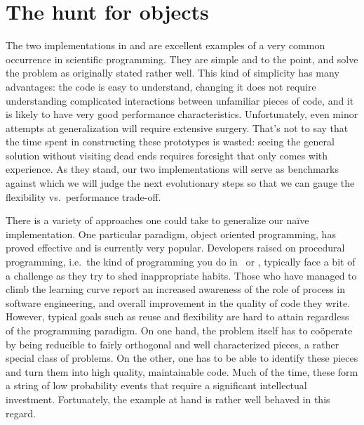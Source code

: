 %
%

\section{The hunt for objects}
\label{sec:classes}

The two implementations in  and  are excellent examples
of a very common occurrence in scientific programming. They are simple and to the point, and
solve the problem as originally stated rather well.  This kind of simplicity has many
advantages: the code is easy to understand, changing it does not require understanding
complicated interactions between unfamiliar pieces of code, and it is likely to have very good
performance characteristics. Unfortunately, even minor attempts at generalization will require
extensive surgery. That's not to say that the time spent in constructing these prototypes is
wasted: seeing the general solution without visiting dead ends requires foresight that only
comes with experience. As they stand, our two implementations will serve as benchmarks against
which we will judge the next evolutionary steps so that we can gauge the flexibility
vs.~performance trade-off.

There is a variety of approaches one could take to generalize our na\"ive implementation. One
particular paradigm, object oriented programming\supercite{meyer-97}, has proved effective and
is currently very popular. Developers raised on procedural programming, i.e.~the kind of
programming you do in \cc\ or \fortran, typically face a bit of a challenge as they try to shed
inappropriate habits. Those who have managed to climb the learning curve report an increased
awareness of the role of process in software engineering, and overall improvement in the
quality of code they write. However, typical goals such as reuse and flexibility are hard to
attain regardless of the programming paradigm. On one hand, the problem itself has to
co\"operate by being reducible to fairly orthogonal and well characterized pieces, a rather
special class of problems. On the other, one has to be able to identify these pieces and turn
them into high quality, maintainable code. Much of the time, these form a string of low
probability events that require a significant intellectual investment. Fortunately, the example
at hand is rather well behaved in this regard.

